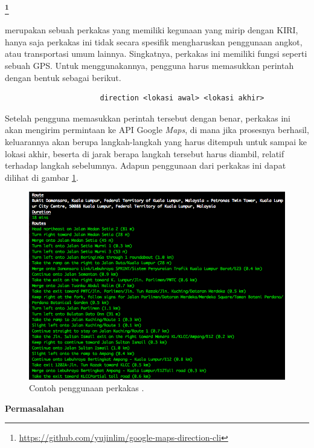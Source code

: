\documentclass[a4paper,twoside]{article}
\begin{document}
\begin{enumerate}
\vspace{\baselineskip}
\textbf{\large{\googlemapscli}\footnote{\href{https://github.com/yujinlim/google-maps-direction-cli}{https://github.com/yujinlim/google-maps-direction-cli}}}
\label{sec:similarapps-googlemapscli}

\googlemapscli merupakan sebuah perkakas \cl yang memiliki kegunaan yang mirip dengan KIRI, hanya saja perkakas ini tidak secara spesifik mengharuskan penggunaan angkot, atau transportasi umum lainnya. Singkatnya, perkakas ini memiliki fungsi seperti sebuah GPS. Untuk menggunakannya, pengguna harus memasukkan perintah dengan bentuk sebagai berikut.

\begin{verbatim}
                      direction <lokasi awal> <lokasi akhir>
\end{verbatim}

Setelah pengguna memasukkan perintah tersebut dengan benar, perkakas ini akan mengirim permintaan ke API Google \textit{Maps}, di mana jika prosesnya berhasil, keluarannya akan berupa langkah-langkah yang harus ditempuh untuk sampai ke lokasi akhir, beserta di jarak berapa langkah tersebut harus diambil, relatif terhadap langkah sebelumnya. Adapun penggunaan dari perkakas ini dapat dilihat di gambar \ref{fig:similarapps-googlemapscli}.

\begin{figure}[ht]
    \centering
    \includegraphics[width=0.66667\linewidth]{googlemapscli}
    \caption[Contoh penggunaan perkakas \googlemapscli]{Contoh penggunaan perkakas \googlemapscli.\protect\footnotemark}
    \label{fig:similarapps-googlemapscli}
\end{figure}

\textbf{Permasalahan}
\label{sec:similarapps-googlemapscli-problem}


\end{enumerate}
\end{document}
